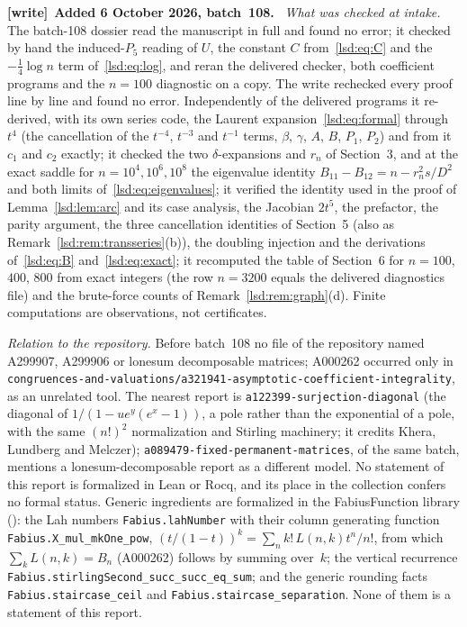 \documentclass[11pt]{article}
\theoremstyle{remark}\newtheorem{remark}{Remark}
\newcommand{\file}[1]{\nolinkurl{#1}}
\newenvironment{writenote}[1][]{\par\smallskip\begingroup\small
 \noindent\textbf{[write]}\if\relax\detokenize{#1}\relax\else~\textbf{#1.}\fi\ }%
 {\par\endgroup\smallskip}
\begin{document}
\begin{writenote}[Added 6 October 2026, batch~108]
\emph{What was checked at intake.} The batch-108 dossier read the manuscript in
full and found no error; it checked by hand the induced-$P_5$ reading of $U$,
the constant $C$ from~\eqref{lsd:eq:C} and the $-\tfrac14\log n$ term
of~\eqref{lsd:eq:log}, and reran the delivered checker, both coefficient
programs and the $n=100$ diagnostic on a copy. The write rechecked every proof
line by line and found no error. Independently of the delivered programs it
re-derived, with its own series code, the Laurent
expansion~\eqref{lsd:eq:formal} through $t^4$ (the cancellation of the $t^{-4}$,
$t^{-3}$ and $t^{-1}$ terms, $\beta$, $\gamma$, $A$, $B$, $P_1$, $P_2$) and
from it $c_1$ and $c_2$ exactly; it checked the two $\delta$-expansions and
$r_n$ of Section~3, and at the exact saddle for $n=10^4,10^6,10^8$ the
eigenvalue identity $B_{11}-B_{12}=n-r_n^2s/D^2$ and both limits
of~\eqref{lsd:eq:eigenvalues}; it verified the identity used in the proof of
Lemma~\ref{lsd:lem:arc} and its case analysis, the Jacobian $2t^5$, the
prefactor, the parity argument, the three cancellation identities of
Section~5 (also as Remark~\ref{lsd:rem:transseries}(b)), the doubling
injection and the derivations of~\eqref{lsd:eq:B} and~\eqref{lsd:eq:exact};
it recomputed the table of Section~6 for $n=100$, $400$, $800$ from exact
integers (the row $n=3200$ equals the delivered diagnostics file) and the
brute-force counts of Remark~\ref{lsd:rem:graph}(d). Finite computations are
observations, not certificates.

\emph{Relation to the repository.} Before batch~108 no file of the repository
named A299907, A299906 or lonesum decomposable matrices; A000262 occurred only
in \file{congruences-and-valuations/a321941-asymptotic-coefficient-integrality},
as an unrelated tool. The nearest report is
\file{a122399-surjection-diagonal} (the diagonal of
$1/(1-ue^y(e^x-1))$, a pole rather than the exponential of a pole, with the
same $(n!)^2$ normalization and Stirling machinery; it credits Khera, Lundberg
and Melczer); \file{a089479-fixed-permanent-matrices}, of the same batch,
mentions a lonesum-decomposable report as a different model. No statement of
this report is formalized in Lean or Rocq, and its place in the collection
confers no formal status. Generic ingredients are formalized in the
FabiusFunction library
(): the Lah numbers
\file{Fabius.lahNumber} with their column generating function
\file{Fabius.X_mul_mkOne_pow}, $(t/(1-t))^k=\sum_nk!\,L(n,k)t^n/n!$, from
which $\sum_kL(n,k)=B_n$ (A000262) follows by summing over~$k$; the vertical
recurrence \file{Fabius.stirlingSecond_succ_succ_eq_sum}; and the generic
rounding facts \file{Fabius.staircase_ceil} and
\file{Fabius.staircase_separation}. None of them is a statement of this
report.
\end{writenote}
\end{document}

